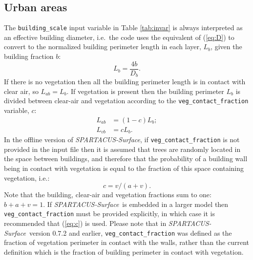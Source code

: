 \documentclass[a4,oneside]{article}
\def\codesize{\small}
\def\spsurf{\emph{SPARTACUS-Surface}}
\def\code#1{{\codesize\texttt{#1}}}
\begin{document}
\subsection{Urban areas}
The \code{building\_scale} input variable in Table \ref{tab:invar} is
always interpreted as an effective building diameter, i.e.\ the code
uses the equivalent of (\ref{eq:D}) to convert to the normalized
building perimeter length in each layer, $L_b$, given the building
fraction $b$:
%
\begin{equation}
  L_b=\frac{4b}{D_b}.
\end{equation}
%
If there is no vegetation then all the building perimeter length is in
contact with clear air, so $L_{ab}=L_b$. If vegetation is present then
the building perimeter $L_b$ is divided between clear-air and
vegetation according to the \code{veg\_contact\_fraction} variable,
$c$:
%
\begin{align}
  L_{ab}&=(1-c)L_b;\\
  L_{vb}&=cL_b.
\end{align}
%
In the offline version of \spsurf, if \code{veg\_contact\_fraction} is
not provided in the input file then it is assumed that trees are
randomly located in the space between buildings, and therefore that
the probability of a building wall being in contact with vegetation is
equal to the fraction of this space containing vegetation, i.e.:
%
\begin{equation}
  c=v/(a+v).\label{eq:c}
\end{equation}
%
Note that the building, clear-air and vegetation fractions sum to one:
$b+a+v=1$. If \spsurf\ is embedded in a larger model then
\code{veg\_contact\_fraction} must be provided explicitly, in which
case it is recommended that (\ref{eq:c}) is used. Please note that in
\spsurf\ version 0.7.2 and earlier, \code{veg\_contact\_fraction} was
defined as the fraction of vegetation perimeter in contact with the
walls, rather than the current definition which is the fraction of
building perimeter in contact with vegetation.
\end{document}
